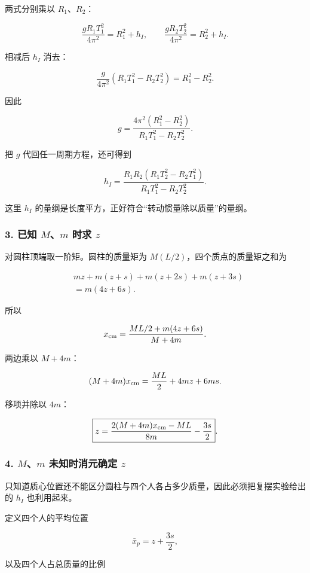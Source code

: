 \documentclass[12pt,a4paper,UTF8]{ctexart}
\begin{document}
两式分别乘以 \(R_1\)、\(R_2\)：

\[
\frac{gR_1T_1^2}{4\pi^2}=R_1^2+h_I,
\qquad
\frac{gR_2T_2^2}{4\pi^2}=R_2^2+h_I.
\]

相减后 \(h_I\) 消去：

\[
\frac{g}{4\pi^2}\left(R_1T_1^2-R_2T_2^2\right)
=R_1^2-R_2^2.
\]

因此

\[
\boxed{
g=\frac{4\pi^2\left(R_1^2-R_2^2\right)}
{R_1T_1^2-R_2T_2^2}
}.
\]

把 \(g\) 代回任一周期方程，还可得到

\[
\boxed{
h_I=
\frac{R_1R_2\left(R_1T_2^2-R_2T_1^2\right)}
{R_1T_1^2-R_2T_2^2}
}.
\]

这里 \(h_I\) 的量纲是长度平方，正好符合``转动惯量除以质量''的量纲。

\subsubsection{\texorpdfstring{3. 已知 \(M\)、\(m\) 时求
\(z\)}{3. 已知 M、m 时求 z}}\label{ux5df2ux77e5-mm-ux65f6ux6c42-z}

对圆柱顶端取一阶矩。圆柱的质量矩为 \(M(L/2)\)，四个质点的质量矩之和为

\[
\begin{aligned}
&m z+m(z+s)+m(z+2s)+m(z+3s)\\
&=m(4z+6s).
\end{aligned}
\]

所以

\[
x_{\rm cm}=\frac{ML/2+m(4z+6s)}{M+4m}.
\]

两边乘以 \(M+4m\)：

\[
(M+4m)x_{\rm cm}=\frac{ML}{2}+4mz+6ms.
\]

移项并除以 \(4m\)：

\[
\boxed{
z=\frac{2(M+4m)x_{\rm cm}-ML}{8m}-\frac{3s}{2}
}.
\]

\subsubsection{\texorpdfstring{4. \(M\)、\(m\) 未知时消元确定
\(z\)}{4. M、m 未知时消元确定 z}}\label{mm-ux672aux77e5ux65f6ux6d88ux5143ux786eux5b9a-z}

只知道质心位置还不能区分圆柱与四个人各占多少质量，因此必须把复摆实验给出的
\(h_I\) 也利用起来。

定义四个人的平均位置

\[
\bar x_p=z+\frac{3s}{2},
\]

以及四个人占总质量的比例
\end{document}
